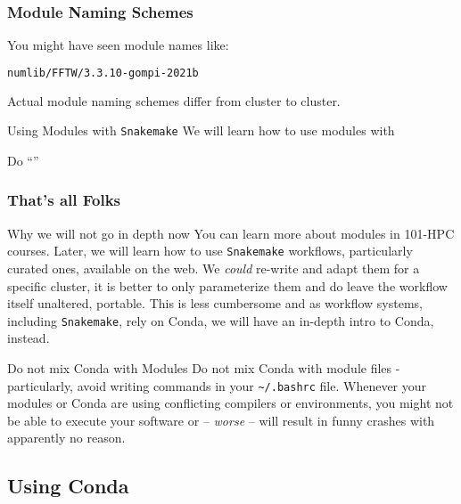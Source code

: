 \begin{frame}[fragile]
  \frametitle{Module Naming Schemes}
   You might have seen module names like:
   \begin{lstlisting}[language=Bash, style=Shell]
numlib/FFTW/3.3.10-gompi-2021b   
   \end{lstlisting}
   Actual module naming schemes differ from cluster to cluster.
   \pause
   \begin{block}{Using Modules with \texttt{Snakemake}}
     We will learn how to use modules with 
   \end{block}
   \pause
   \begin{task}
   	  Do ``''
   \end{task}
\end{frame}

\begin{frame}[fragile]
  \frametitle{That's all Folks}
   \vspace{-0.8em}
  \begin{alertblock}{Why we will not go in depth now}
You can learn more about modules in 101-HPC courses. Later, we will learn how to use \texttt{Snakemake} workflows, particularly curated ones, available on the web. We \emph{could} re-write and adapt them for a specific cluster, it is better to only parameterize them and do leave the workflow itself unaltered, portable. This is less cumbersome and as workflow systems, including \texttt{Snakemake}, rely on Conda, we will have an in-depth intro to Conda, instead.
  \end{alertblock}
  \vfill
  \begin{alertblock}{Do not mix Conda with Modules}
   Do not mix Conda with module files - particularly, avoid writing  commands in your \texttt{\textasciitilde/.bashrc} file.\newline
   Whenever your modules or Conda are using conflicting compilers or environments, you might not be able to execute your software or -- \emph{worse} -- will result in funny crashes with apparently no reason.
  \end{alertblock}
\end{frame}

\subsection{Using Conda}

